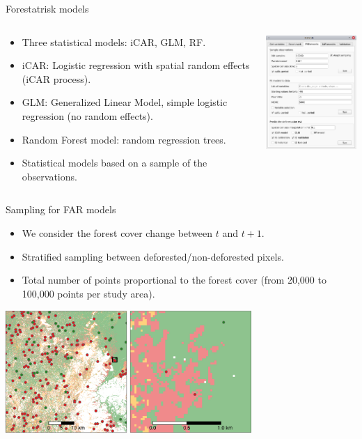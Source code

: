 \documentclass[10pt,table,dvipsnames,compress]{beamer}
\begin{document}
\begin{frame}[label={sec:orgefdba21}]{Forestatrisk models}
\begin{columns}
\begin{column}{0.5\columnwidth}
\begin{itemize}
\item Three statistical models: iCAR, GLM, RF.
\item iCAR: Logistic regression with spatial random effects (iCAR process).
\item GLM: Generalized Linear Model, simple logistic regression (no random effects).
\item Random Forest model: random regression trees.
\item Statistical models based on a sample of the observations.
\end{itemize}
\end{column}

\begin{column}{0.5\columnwidth}
\begin{center}
\includegraphics[width=5cm]{figs/plugin_api/interface_far_models.png}
\end{center}  
\end{column}
\end{columns}
\end{frame}

\begin{frame}[label={sec:org073c55e}]{Sampling for FAR models}
\begin{itemize}
\item We consider the forest cover change between \(t\) and \(t+1\).
\item Stratified sampling between deforested/non-deforested pixels.
\item Total number of points proportional to the forest cover (from
20,000 to 100,000 points per study area).
\end{itemize}

\begin{center}
\includegraphics[width=0.7\textwidth]{figs/sm/sample.png}
\end{center}
\end{frame}
\end{document}
